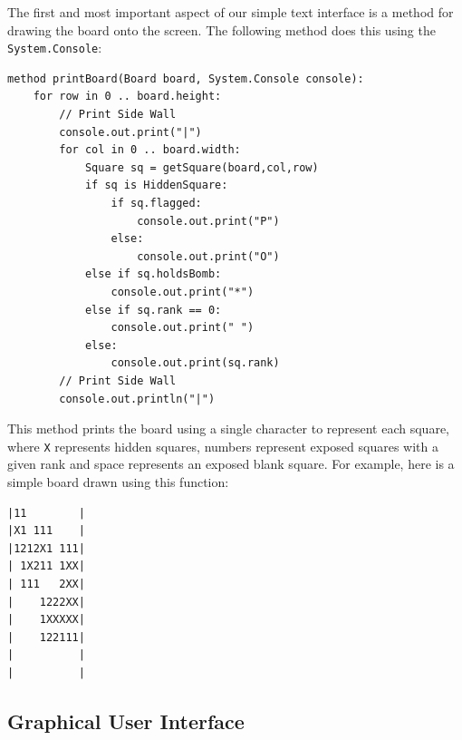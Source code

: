 The first and most important aspect of our simple text interface is a method for drawing the board onto the screen.  The following method does this using the \lstinline{System.Console}:
\begin{lstlisting}
method printBoard(Board board, System.Console console):
    for row in 0 .. board.height:
        // Print Side Wall
        console.out.print("|")
        for col in 0 .. board.width:
            Square sq = getSquare(board,col,row)
            if sq is HiddenSquare:
                if sq.flagged:
                    console.out.print("P")
                else:
                    console.out.print("O")
            else if sq.holdsBomb:
                console.out.print("*")
            else if sq.rank == 0:
                console.out.print(" ")
            else:
                console.out.print(sq.rank)
        // Print Side Wall
        console.out.println("|")
\end{lstlisting} 

This method prints the board using a single character to represent each square, where \verb+X+ represents hidden squares, numbers represent exposed squares with a given rank and space represents an exposed blank square.  For example, here is a simple board drawn using this function:
\begin{lstlisting}
|11        |
|X1 111    |
|1212X1 111|
| 1X211 1XX|
| 111   2XX|
|    1222XX|
|    1XXXXX|
|    122111|
|          |
|          |
\end{lstlisting}

\subsection{Graphical User Interface}